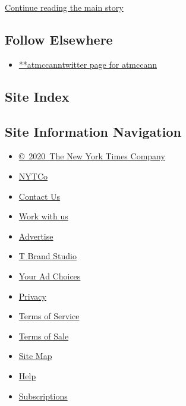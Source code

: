 \protect\hyperlink{after-mid2}{Continue reading the main story}

\hypertarget{follow-elsewhere}{%
\subsection{Follow Elsewhere}\label{follow-elsewhere}}

\begin{itemize}
\tightlist
\item
  \href{https://twitter.com/atmccann}{**atmccanntwitter page for
  atmccann}
\end{itemize}

\hypertarget{site-index}{%
\subsection{Site Index}\label{site-index}}

\hypertarget{site-information-navigation}{%
\subsection{Site Information
Navigation}\label{site-information-navigation}}

\begin{itemize}
\tightlist
\item
  \href{https://help.nytimes3xbfgragh.onion/hc/en-us/articles/115014792127-Copyright-notice}{©~2020~The
  New York Times Company}
\end{itemize}

\begin{itemize}
\tightlist
\item
  \href{https://www.nytco.com/}{NYTCo}
\item
  \href{https://help.nytimes3xbfgragh.onion/hc/en-us/articles/115015385887-Contact-Us}{Contact
  Us}
\item
  \href{https://www.nytco.com/careers/}{Work with us}
\item
  \href{https://nytmediakit.com/}{Advertise}
\item
  \href{http://www.tbrandstudio.com/}{T Brand Studio}
\item
  \href{https://www.nytimes3xbfgragh.onion/privacy/cookie-policy\#how-do-i-manage-trackers}{Your
  Ad Choices}
\item
  \href{https://www.nytimes3xbfgragh.onion/privacy}{Privacy}
\item
  \href{https://help.nytimes3xbfgragh.onion/hc/en-us/articles/115014893428-Terms-of-service}{Terms
  of Service}
\item
  \href{https://help.nytimes3xbfgragh.onion/hc/en-us/articles/115014893968-Terms-of-sale}{Terms
  of Sale}
\item
  \href{https://spiderbites.nytimes3xbfgragh.onion}{Site Map}
\item
  \href{https://help.nytimes3xbfgragh.onion/hc/en-us}{Help}
\item
  \href{https://www.nytimes3xbfgragh.onion/subscription?campaignId=37WXW}{Subscriptions}
\end{itemize}
